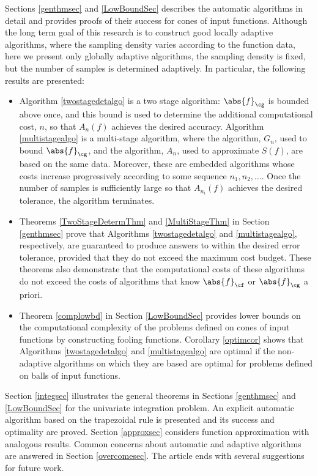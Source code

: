 \documentclass[]{elsarticle}
\theoremstyle{definition}
\theoremstyle{remark}
\newcommand{\Fnorm}[1]{\abs{#1}_{\cf}}
\newcommand{\Gnorm}[1]{\abs{#1}_{\cg}}
\begin{document}
Sections \ref{genthmsec} and \ref{LowBoundSec} describes the automatic algorithms in detail and provides proofs of their success for cones of input functions.  Although the long term goal of this research is to construct good locally adaptive algorithms, where the sampling density varies according to the function data, here we present only globally adaptive algorithms, the sampling density is fixed, but the number of samples is determined adaptively.  In particular, the following results are presented:
\begin{itemize}

\item Algorithm \ref{twostagedetalgo} is a two stage algorithm: $\Gnorm{f}$ is bounded above once, and  this bound is used to determine the additional computational cost, $n$, so that $A_n(f)$ achieves the desired accuracy. Algorithm \ref{multistagealgo} is a multi-stage algorithm, where the algorithm, $G_n$, used to bound $\Gnorm{f}$, and the algorithm, $A_n$, used to approximate $S(f)$, are based on the same data. Moreover, these are embedded algorithms whose costs increase progressively according to some sequence $n_1, n_2, \ldots$.  Once the number of samples is sufficiently large so that $A_{n_i}(f)$ achieves the desired tolerance, the algorithm terminates.

\item Theorems \ref{TwoStageDetermThm} and \ref{MultiStageThm} in Section \ref{genthmsec} prove that Algorithms \ref{twostagedetalgo} and \ref{multistagealgo}, respectively, are guaranteed to produce answers to within the desired error tolerance, provided that they do not exceed the maximum cost budget.  These theorems also demonstrate that the computational costs of these algorithms do not exceed the costs of algorithms that know $\Fnorm{f}$ or $\Gnorm{f}$ a priori.

\item Theorem \ref{complowbd} in Section \ref{LowBoundSec} provides lower bounds on the computational complexity of the problems defined on cones of input functions by constructing fooling functions.  Corollary \ref{optimcor} shows that Algorithms \ref{twostagedetalgo} and \ref{multistagealgo} are optimal if the non-adaptive algorithms on which they are based are optimal for problems defined on balls of input functions.

\end{itemize}

Section \ref{integsec} illustrates the general theorems in Sections \ref{genthmsec} and \ref{LowBoundSec} for the univariate integration problem.  An explicit automatic algorithm based on the trapezoidal rule is presented and its success and optimality are proved.  Section \ref{approxsec}  considers function approximation with analogous results.  Common concerns about automatic and adaptive algorithms are answered in Section \ref{overcomesec}. The article ends with several suggestions for future work.
\end{document}
